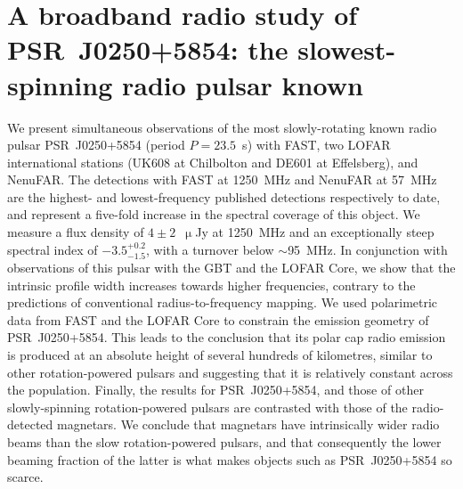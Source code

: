 \chapter[Broadband radio study of PSR~J0250+5854]{A broadband radio study of PSR~J0250+5854: the slowest-spinning radio pulsar known}
\label{chapt: J0250}

We present simultaneous observations of the most slowly-rotating known radio pulsar PSR~J0250+5854 (period $P=23.5$~s) with FAST, two LOFAR international stations (UK608 at Chilbolton and DE601 at Effelsberg), and NenuFAR. The detections with FAST at 1250~MHz and NenuFAR at 57~MHz are the highest- and lowest-frequency published detections respectively to date, and represent a five-fold increase in the spectral coverage of this object. We measure a flux density of $4\pm2$~$\upmu$Jy at 1250~MHz and an exceptionally steep spectral index of $-3.5^{+0.2}_{-1.5}$, with a turnover below $\sim$95~MHz. In conjunction with observations of this pulsar with the GBT and the LOFAR Core, we show that the intrinsic profile width increases towards higher frequencies, contrary to the predictions of conventional radius-to-frequency mapping. We used polarimetric data from FAST and the LOFAR Core to constrain the emission geometry of PSR~J0250+5854. This leads to the conclusion that its polar cap radio emission is produced at an absolute height of several hundreds of kilometres, similar to other rotation-powered pulsars and suggesting that it is relatively constant across the population. Finally, the results for PSR~J0250+5854, and those of other slowly-spinning rotation-powered pulsars are contrasted with those of the radio-detected magnetars. We conclude that magnetars have intrinsically wider radio beams than the slow rotation-powered pulsars, and that consequently the lower beaming fraction of the latter is what makes objects such as PSR~J0250+5854 so scarce.


